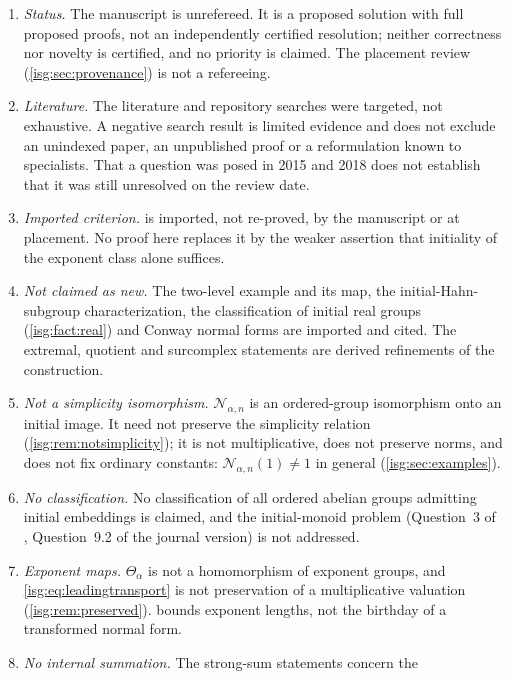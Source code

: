 \documentclass[11pt]{article}
\theoremstyle{definition}
\theoremstyle{remark}
\newcommand{\Rect}{\mathcal{N}_{\alpha,n}}
\begin{document}
\begin{enumerate}[label=\textup{(N\arabic*)},leftmargin=*]
\item \emph{Status.} The manuscript is unrefereed. It is a proposed
      solution with full proposed proofs, not an independently certified
      resolution; neither correctness nor novelty is certified, and no
      priority is claimed. The placement review
      (\cref{isg:sec:provenance}) is not a refereeing.
\item \emph{Literature.} The literature and repository searches were
      targeted, not exhaustive. A negative search result is limited
      evidence and does not exclude an unindexed paper, an unpublished
      proof or a reformulation known to specialists. That a question was
      posed in 2015 and 2018 does not establish that it was still
      unresolved on the review date.
\item \emph{Imported criterion.}  is imported, not
      re-proved, by the manuscript or at placement. No proof here
      replaces it by the weaker assertion that initiality of the exponent
      class alone suffices.
\item \emph{Not claimed as new.} The two-level example and its map,
      the initial-Hahn-subgroup characterization, the classification of
      initial real groups (\cref{isg:fact:real}) and Conway normal forms
      are imported and cited. The extremal, quotient and surcomplex
      statements are derived refinements of the construction.
\item \emph{Not a simplicity isomorphism.} $\Rect$ is an ordered-group
      isomorphism onto an initial image. It need not preserve the
      simplicity relation (\cref{isg:rem:notsimplicity}); it is not
      multiplicative, does not preserve norms, and does not fix ordinary
      constants: $\Rect(1)\ne1$ in general (\cref{isg:sec:examples}).
\item \emph{No classification.} No classification of all ordered abelian
      groups admitting initial embeddings is claimed, and the
      initial-monoid problem (Question~3 of \cite{EK}, Question~9.2 of
      the journal version) is not addressed.
\item \emph{Exponent maps.} $\Theta_\alpha$ is not a homomorphism of
      exponent groups, and \eqref{isg:eq:leadingtransport} is not
      preservation of a multiplicative valuation
      (\cref{isg:rem:preserved}).  bounds exponent
      lengths, not the birthday of a transformed normal form.
\item \emph{No internal summation.} The strong-sum statements concern the

\end{enumerate}
\end{document}

